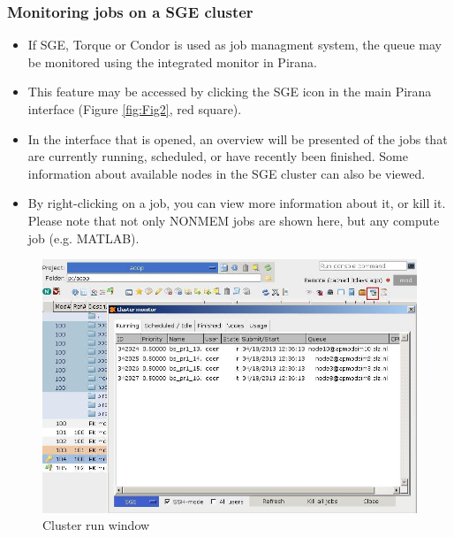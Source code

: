 \subsubsection*{Monitoring jobs on a SGE cluster}
  \begin{itemize}
  \item If SGE, Torque or Condor is used as job managment system, the queue may be
    monitored using the integrated monitor in Pirana.
  \item This feature may be accessed by clicking the SGE icon in the
    main Pirana interface (Figure \ref{fig:Fig2}, red square).
  \item In the interface that is opened, an overview will be presented
    of the jobs that are currently running, scheduled, or have
    recently been finished. Some information about available nodes in
    the SGE cluster can also be viewed.
  \item By right-clicking on a job, you can view more information
    about it, or kill it. Please note that not only NONMEM jobs are
    shown here, but any compute job (e.g. MATLAB).
\end{itemize}

\begin{figure}[h] \centering
    \includegraphics[scale=.4]{images/cluster_6.JPG}
    \caption{Cluster run window\label{fig:Fig6}
}
\end{figure}
